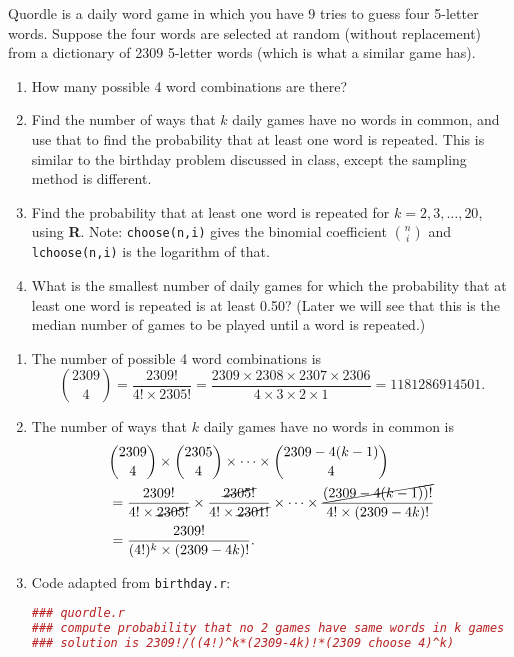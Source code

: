 \documentclass[12pt]{article}
\newenvironment{problem}[2][Problem]{\begin{trivlist}
\item[\hskip \labelsep {\bfseries #1}\hskip \labelsep {\bfseries #2.}]}
{\end{trivlist}}
\begin{document}
\begin{problem}{7} Quordle is a daily word game in which you have 
  9 tries to guess four 5-letter words. Suppose the four words are 
  selected at random (without replacement) from a dictionary of 2309 
  5-letter words (which is what a similar game has).
  \begin{enumerate}
    \item How many possible 4 word combinations are there?
    \item Find the number of ways that $k$ daily games have no words in common, 
    and use that to find the probability that at least one word is repeated. 
    This is similar to the birthday problem discussed in class, 
    except the sampling method is different.
    \item Find the probability that at least one word is repeated for 
    $k = 2, 3,\dots, 20$, using \textbf{R}.
    Note: \texttt{choose(n,i)} gives the binomial coefficient $\binom{n}{i}$
    and \texttt{lchoose(n,i)} is the logarithm of that.
    \item What is the smallest number of daily games for which the probability 
    that at least one word is repeated is at least 0.50? 
    (Later we will see that this is the median number of games to be played 
    until a word is repeated.)
  \end{enumerate}
  \begin{enumerate}
    \item The number of possible 4 word combinations is
    \[
      \binom{2309}{4} = \frac{2309!}{4!\times2305!} = 
      \frac{2309\times2308\times2307\times2306}{4\times3\times2\times1}
      = 1181286914501.
    \]
    \item The number of ways that $k$ daily games have no words in common is
    \[
    \begin{aligned}
      &\binom{2309}{4} \times \binom{2305}{4} \times \cdots \times
      \binom{2309-4(k-1)}{4}\\ 
      &= \frac{2309!}{4!\times\cancel{2305!}} \times
      \frac{\cancel{2305!}}{4!\times\cancel{2301!}} \times \cdots \times
      \frac{\cancel{(2309-4(k-1))!}}{4!\times(2309-4k)!} \\
      &= \frac{2309!}{(4!)^k\times(2309-4k)!}.
    \end{aligned}
    \]
    \item Code adapted from \texttt{birthday.r}:
    \begin{lstlisting}[language=R, caption=quordle.r]
### quordle.r
### compute probability that no 2 games have same words in k games
### solution is 2309!/((4!)^k*(2309-4k)!*(2309 choose 4)^k)


\end{lstlisting}
\end{enumerate}
\end{problem}
\end{document}
